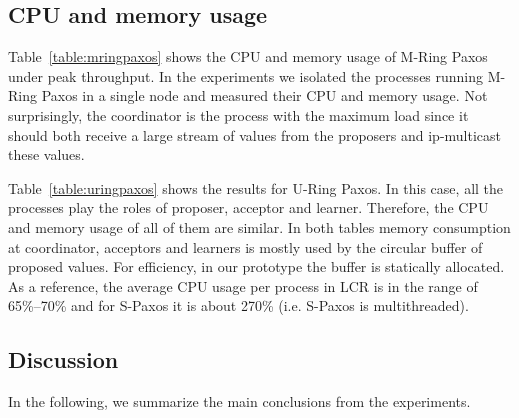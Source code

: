 \documentclass[final,3p,times,twocolumn,authoryear]{elsarticle}
\begin{document}
\subsection{CPU and memory usage}
\label{sec:cpumem}

Table~\ref{table:mringpaxos} shows the CPU and memory usage of M-Ring Paxos under peak throughput. In the experiments we isolated the processes running M-Ring Paxos in a single node and measured their CPU and memory usage. Not surprisingly, the coordinator is the process with the maximum load since it should both receive a large stream of values from the proposers and ip-multicast these values. 

Table~\ref{table:uringpaxos} shows the results for U-Ring Paxos. In this case, all the processes play the roles of proposer, acceptor and learner. Therefore, the CPU and memory usage of all of them are similar. In both tables memory consumption at coordinator, acceptors and learners is mostly used by the circular buffer of proposed values. For efficiency, in our prototype the buffer is statically allocated.
As a reference, the average CPU usage per process in LCR is in the range of 65\%--70\% and for S-Paxos it is about 270\% (i.e. S-Paxos is multithreaded).
\subsection{Discussion}
\label{sec:exp:con}
In the following, we summarize the main conclusions from the experiments.
\end{document}
